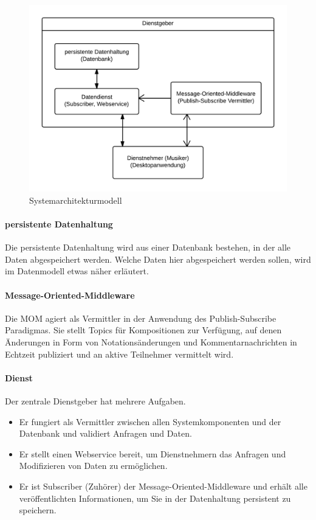\documentclass[12pt]{scrartcl}
\begin{document}
\begin{figure}[H]
\centering
\includegraphics[scale=.25]{figures/systemarchitekturmodell}
\caption{Systemarchitekturmodell}
\label{fig:systemarchitekturmodell}
\end{figure}

\paragraph{persistente Datenhaltung}
Die persistente Datenhaltung wird aus einer Datenbank bestehen, in der alle Daten abgespeichert werden. Welche Daten hier abgespeichert werden sollen, wird im Datenmodell etwas näher erläutert.

\paragraph{Message-Oriented-Middleware}
Die MOM agiert als Vermittler in der Anwendung des Publish-Subscribe Paradigmas. Sie stellt Topics für Kompositionen zur Verfügung, auf denen Änderungen in Form von Notationsänderungen und Kommentarnachrichten in Echtzeit publiziert und an aktive Teilnehmer vermittelt wird.

\paragraph{Dienst}
Der zentrale Dienstgeber hat mehrere Aufgaben.
\begin{itemize}
\item Er fungiert als Vermittler zwischen allen Systemkomponenten und der Datenbank und validiert Anfragen und Daten.
\item Er stellt einen Webservice bereit, um Dienstnehmern das Anfragen und Modifizieren von Daten zu ermöglichen.
\item Er ist Subscriber (Zuhörer) der Message-Oriented-Middleware und erhält alle veröffentlichten Informationen, um Sie in der Datenhaltung persistent zu speichern.
\end{itemize}
\end{document}
